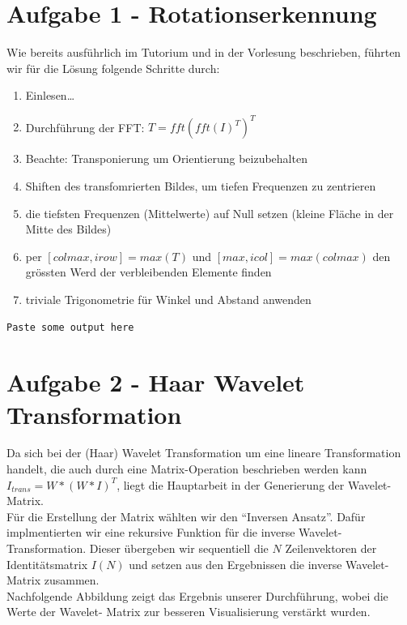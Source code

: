 



\newcommand{\nr}{2}
\lstset{language=matlab}


\section*{Aufgabe 1 - Rotationserkennung}
Wie bereits ausf\"uhrlich im Tutorium und in der Vorlesung beschrieben, f\"uhrten wir f\"ur die
L\"osung folgende Schritte durch:

\begin{enumerate}
\item Einlesen\ldots
\item Durchf\"uhrung der FFT: $T = fft( fft(I)^{T} )^{T}$
\item Beachte: Transponierung um Orientierung beizubehalten
\item Shiften des transfomrierten Bildes, um tiefen Frequenzen zu zentrieren
\item die tiefsten Frequenzen (Mittelwerte) auf Null setzen 
      (kleine Fl\"ache in der Mitte des Bildes)
\item per $[colmax, irow] = max(T)$ und $[max, icol] = max(colmax)$ den gr\"ossten Werd der
      verbleibenden Elemente finden
\item triviale Trigonometrie f\"ur Winkel und Abstand anwenden
\end{enumerate}


\begin{lstlisting}[caption=Ausgabe]
Paste some output here
\end{lstlisting}


\section*{Aufgabe 2 - Haar Wavelet Transformation}
Da sich bei der (Haar) Wavelet Transformation um eine lineare Transformation handelt, die auch
durch eine Matrix-Operation beschrieben werden kann $I_{trans} = W * (W*I)^{T}$, liegt die
Hauptarbeit in der Generierung der Wavelet-Matrix.
\\
F\"ur die Erstellung der Matrix w\"ahlten wir den ``Inversen Ansatz''. Daf\"ur implmentierten wir
eine rekursive Funktion f\"ur die inverse Wavelet-Transformation. Dieser \"ubergeben wir sequentiell die $N$ Zeilenvektoren der Identit\"atsmatrix $I(N)$ und setzen aus den Ergebnissen die inverse
Wavelet-Matrix zusammen.
\\
Nachfolgende Abbildung zeigt das Ergebnis unserer Durchf\"uhrung, wobei die Werte der Wavelet-
Matrix zur besseren Visualisierung verst\"arkt wurden.

